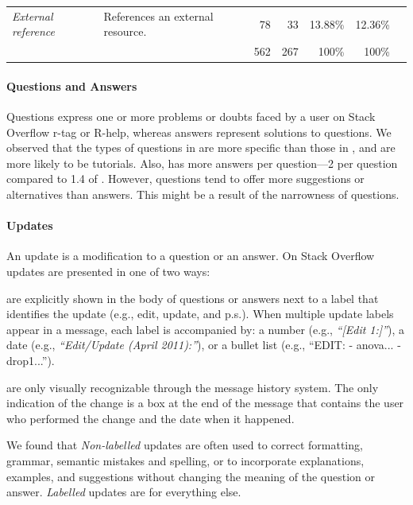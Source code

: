\begin{table}[!htb]
\begin{small}
\begin{tabular}[h]{p{2.3cm}p{10.3cm}rrrrr}
  \emph{External reference}     & References an external resource.                                                                                                                         & 78           & 33               & 13.88\%        & 12.36\%        \\\cline{3-6}
                                &                                                                                                                                                          &{562}  & {267}     & {100\%} & {100\%} \\
  \bottomrule
        \end{tabular}
      \end{small}
      \label{table:type-of-knowledge}
\vspace{-3mm}
    \end{table}

\paragraph*{Questions and Answers}
    Questions express one or more problems or doubts faced by a user on Stack Overflow r-tag or R-help, whereas answers represent solutions to questions.  We observed that the types of questions in \SO are more specific than those in \RH, and are more likely to be tutorials. Also, \SO has more answers per question---2 per question compared to 1.4 of \RH. However, \RH questions tend to offer more suggestions or alternatives than \SO answers. This might be a result of the narrowness of \SO questions.

\paragraph*{Updates}
An update is a modification to a question or an answer. On Stack Overflow updates are presented in one of two ways:
\begin{description}[itemsep=3pt, topsep=2pt, leftmargin=1em, parsep=0pt]
\item[Labelled updates] are explicitly shown in the body of questions or answers next to a label that identifies the update (e.g., edit, update, and p.s.).
  When multiple update labels appear in a message, each label is accompanied by: a number (e.g., \textit{``[Edit 1:]''}), a date (e.g., \textit{``Edit/Update (April 2011):''}), or a bullet list
  (e.g., ``EDIT: - anova... -drop1...'').

\item[Non-labelled updates] are only visually recognizable through the message history system. The only indication of the change is a box at the end of the
  message that contains the user who performed the change and the date when it happened.
\end{description}
We found that \textit{Non-labelled} updates are often used to correct formatting, grammar, semantic mistakes and spelling, or to incorporate explanations, examples, and suggestions without changing the meaning of the question or answer. \textit{Labelled} updates are for everything else.

